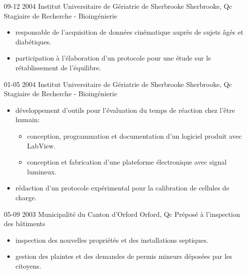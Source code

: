 \documentclass[print]{friggos-cv} %
\begin{document}
\begin{entrylist}
  \entryBul
    {09-12 2004}
    {Institut Universitaire de Gériatrie de Sherbrooke}
    {Sherbrooke, Qc}
    {Stagiaire de Recherche - Bioingénierie}
    {
     \begin{itemize}[leftmargin=*]
       \setlength\itemsep{0pt}
       \item responsable de l'acquisition de données cinématique auprès de sujets âgés et diabétiques.
       \item participation à l'élaboration d'un protocole pour une étude sur le rétablissement de l'équilibre.
     \end{itemize}
     }
\end{entrylist}
\begin{entrylist}
  \entryBul
    {01-05 2004}
    {Institut Universitaire de Gériatrie de Sherbrooke}
    {Sherbrooke, Qc}
    {Stagiaire de Recherche - Bioingénierie}
    {
     \begin{itemize}[leftmargin=*]
       \setlength\itemsep{0pt}       
       \item développement d'outils pour l'évaluation du temps de réaction chez l'être humain:
         \begin{itemize}
           \item conception, programmation et documentation d'un logiciel produit avec LabView.
           \item conception et fabrication d'une plateforme électronique avec signal lumineux.
         \end{itemize}
       \item rédaction d'un protocole expérimental pour la calibration de cellules de charge.
     \end{itemize}
     }
\end{entrylist}
\begin{entrylist}
  \entryBul
    {05-09 2003}
    {Municipalité du Canton d'Orford}
    {Orford, Qc}
    {Préposé à l'inspection des bâtiments}
    {
     \begin{itemize}[leftmargin=*]
       \setlength\itemsep{0pt}  
       \item inspection des nouvelles propriétés et des installations septiques.
       \item gestion des plaintes et des demandes de permis mineurs déposées par les citoyens.
     \end{itemize}
    }
\end{entrylist}
\end{document}
